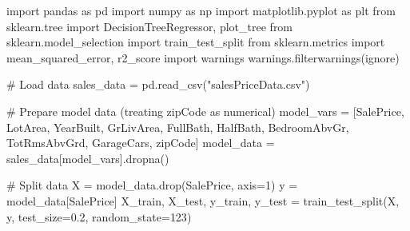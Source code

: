 \documentclass[
  letterpaper,
  DIV=11,
  numbers=noendperiod]{scrartcl}
\newenvironment{Shaded}{\begin{snugshade}}{\end{snugshade}}
\newcommand{\CommentTok}[1]{\textcolor[rgb]{0.37,0.37,0.37}{#1}}
\newcommand{\DecValTok}[1]{\textcolor[rgb]{0.68,0.00,0.00}{#1}}
\newcommand{\FloatTok}[1]{\textcolor[rgb]{0.68,0.00,0.00}{#1}}
\newcommand{\ImportTok}[1]{\textcolor[rgb]{0.00,0.46,0.62}{#1}}
\newcommand{\NormalTok}[1]{\textcolor[rgb]{0.00,0.23,0.31}{#1}}
\newcommand{\OperatorTok}[1]{\textcolor[rgb]{0.37,0.37,0.37}{#1}}
\newcommand{\StringTok}[1]{\textcolor[rgb]{0.13,0.47,0.30}{#1}}
\begin{document}
\label{load-and-model-python}
\begin{Shaded}
\begin{Highlighting}[]
\ImportTok{import}\NormalTok{ pandas }\ImportTok{as}\NormalTok{ pd}
\ImportTok{import}\NormalTok{ numpy }\ImportTok{as}\NormalTok{ np}
\ImportTok{import}\NormalTok{ matplotlib.pyplot }\ImportTok{as}\NormalTok{ plt}
\ImportTok{from}\NormalTok{ sklearn.tree }\ImportTok{import}\NormalTok{ DecisionTreeRegressor, plot\_tree}
\ImportTok{from}\NormalTok{ sklearn.model\_selection }\ImportTok{import}\NormalTok{ train\_test\_split}
\ImportTok{from}\NormalTok{ sklearn.metrics }\ImportTok{import}\NormalTok{ mean\_squared\_error, r2\_score}
\ImportTok{import}\NormalTok{ warnings}
\NormalTok{warnings.filterwarnings(}\StringTok{\textquotesingle{}ignore\textquotesingle{}}\NormalTok{)}

\CommentTok{\# Load data}
\NormalTok{sales\_data }\OperatorTok{=}\NormalTok{ pd.read\_csv(}\StringTok{"salesPriceData.csv"}\NormalTok{)}

\CommentTok{\# Prepare model data (treating zipCode as numerical)}
\NormalTok{model\_vars }\OperatorTok{=}\NormalTok{ [}\StringTok{\textquotesingle{}SalePrice\textquotesingle{}}\NormalTok{, }\StringTok{\textquotesingle{}LotArea\textquotesingle{}}\NormalTok{, }\StringTok{\textquotesingle{}YearBuilt\textquotesingle{}}\NormalTok{, }\StringTok{\textquotesingle{}GrLivArea\textquotesingle{}}\NormalTok{, }\StringTok{\textquotesingle{}FullBath\textquotesingle{}}\NormalTok{, }
              \StringTok{\textquotesingle{}HalfBath\textquotesingle{}}\NormalTok{, }\StringTok{\textquotesingle{}BedroomAbvGr\textquotesingle{}}\NormalTok{, }\StringTok{\textquotesingle{}TotRmsAbvGrd\textquotesingle{}}\NormalTok{, }\StringTok{\textquotesingle{}GarageCars\textquotesingle{}}\NormalTok{, }\StringTok{\textquotesingle{}zipCode\textquotesingle{}}\NormalTok{]}
\NormalTok{model\_data }\OperatorTok{=}\NormalTok{ sales\_data[model\_vars].dropna()}

\CommentTok{\# Split data}
\NormalTok{X }\OperatorTok{=}\NormalTok{ model\_data.drop(}\StringTok{\textquotesingle{}SalePrice\textquotesingle{}}\NormalTok{, axis}\OperatorTok{=}\DecValTok{1}\NormalTok{)}
\NormalTok{y }\OperatorTok{=}\NormalTok{ model\_data[}\StringTok{\textquotesingle{}SalePrice\textquotesingle{}}\NormalTok{]}
\NormalTok{X\_train, X\_test, y\_train, y\_test }\OperatorTok{=}\NormalTok{ train\_test\_split(X, y, test\_size}\OperatorTok{=}\FloatTok{0.2}\NormalTok{, random\_state}\OperatorTok{=}\DecValTok{123}\NormalTok{)}


\end{Highlighting}
\end{Shaded}
\end{document}
